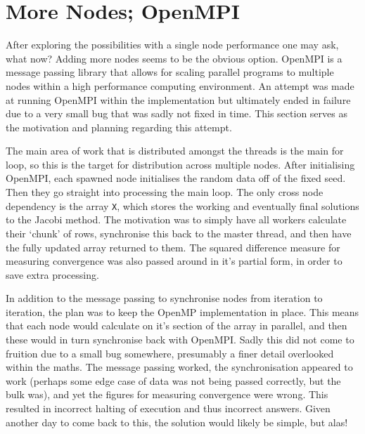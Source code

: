 \documentclass[11pt,twocolumn,a4paper]{article}
\begin{document}
\section{More Nodes; OpenMPI}
After exploring the possibilities with a single node performance one may ask, what now? Adding more nodes seems to be the obvious option. OpenMPI is a message passing library that allows for scaling parallel programs to multiple nodes within a high performance computing environment. An attempt was made at running OpenMPI within the implementation but ultimately ended in failure due to a very small bug that was sadly not fixed in time. This section serves as the motivation and planning regarding this attempt. \par

The main area of work that is distributed amongst the threads is the main for loop, so this is the target for distribution across multiple nodes. After initialising OpenMPI, each spawned node initialises the random data off of the fixed seed. Then they go straight into processing the main loop. The only cross node dependency is the array \texttt{X}, which stores the working and eventually final solutions to the Jacobi method. The motivation was to simply have all workers calculate their `chunk' of rows, synchronise this back to the master thread, and then have the fully updated array returned to them. The squared difference measure for measuring convergence was also passed around in it's partial form, in order to save extra processing. \par

In addition to the message passing to synchronise nodes from iteration to iteration, the plan was to keep the OpenMP implementation in place. This means that each node would calculate on it's section of the array in parallel, and then these would in turn synchronise back with OpenMPI. Sadly this did not come to fruition due to a small bug somewhere, presumably a finer detail overlooked within the maths. The message passing worked, the synchronisation appeared to work (perhaps some edge case of data was not being passed correctly, but the bulk was), and yet the figures for measuring convergence were wrong. This resulted in incorrect halting of execution and thus incorrect answers. Given another day to come back to this, the solution would likely be simple, but alas! \par


\end{document}
